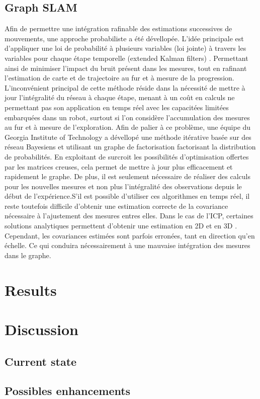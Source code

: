 \documentclass[twoside,twocolumn]{article}
\begin{document}
\subsection{Graph SLAM}
Afin de permettre une intégration rafinable des estimations successives de mouvements, une approche probabiliste a été dévellopée.
L'idée principale est d'appliquer une loi de probabilité à plusieurs variables (loi jointe) à travers les variables pour chaque étape
temporelle (extended Kalman filters) \cite{arulampalam_tutorial_2002}. Permettant ainsi de minimiser l'impact du bruit présent dans les mesures,
tout en rafinant l'estimation de carte et de trajectoire au fur et à mesure de la progression. L'inconvénient principal de cette méthode réside dans
la nécessité de mettre à jour l'intégralité du réseau à chaque étape, menant à un coût en calculs ne permettant pas son application en temps réel avec
les capacitées limitées embarquées dans un robot, surtout si l'on considère l'accumulation des mesures au fur et à mesure de l'exploration.
Afin de palier à ce problème, une équipe du Georgia Institute of Technology a dévellopé une méthode itérative\cite{kaess_isam:_2008} basée sur des réseau Bayesiens
et utilisant un graphe de factorisation factorisant la distribution de probabilités. En exploitant de surcroit les possibilités d'optimisation offertes
par les matrices creuses, cela permet de mettre à jour plus efficacement et rapidement le graphe. De plus, il est seulement nécessaire de réaliser
des calculs pour les nouvelles mesures et non plus l'intégralité des observations depuis le début de l'expérience.S'il est possible d'utiliser ces algorithmes en temps réel,
il reste toutefois difficile d'obtenir une estimation correcte de la covariance nécessaire à l'ajustement des mesures entres elles.
Dans le cas de l'ICP, certaines solutions analytiques permettent d'obtenir une estimation en 2D \cite{censi_accurate_2007} et en 3D \cite{prakhya_closed-form_2015}.
Cependant, les covariances estimées sont parfois erronées, tant en direction qu'en échelle. Ce qui conduira nécessairement à une mauvaise intégration des mesures dans le graphe.



\section{Results}
\blindtext


\section{Discussion}
\subsection{Current state}
\blindtext
\subsection{Possibles enhancements}
\blindtext

\printbibliography
\end{document}
